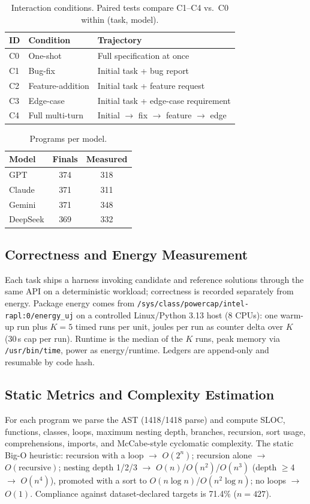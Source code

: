 \documentclass[conference]{IEEEtran}
\begin{document}
\begin{table}[htbp]
\caption{Interaction conditions. Paired tests compare C1--C4 vs.\ C0 within
(task, model).}
\label{tab:conds}
\centering
\begin{tabular}{lll}
\toprule
ID & Condition & Trajectory \\
\midrule
C0 & One-shot & Full specification at once \\
C1 & Bug-fix & Initial task + bug report \\
C2 & Feature-addition & Initial task + feature request \\
C3 & Edge-case & Initial task + edge-case requirement \\
C4 & Full multi-turn & Initial $\rightarrow$ fix $\rightarrow$ feature $\rightarrow$ edge \\
\bottomrule
\end{tabular}
\end{table}

\begin{table}[htbp]
\caption{Programs per model.}
\label{tab:models}
\centering
\begin{tabular}{lcc}
\toprule
Model & Finals & Measured \\
\midrule
GPT & 374 & 318 \\
Claude & 371 & 311 \\
Gemini & 371 & 348 \\
DeepSeek & 369 & 332 \\
\bottomrule
\end{tabular}
\end{table}

\subsection{Correctness and Energy Measurement}
Each task ships a harness invoking candidate and reference solutions through
the same API on a deterministic workload; correctness is recorded separately
from energy. Package energy comes from
\texttt{/sys/class/powercap/intel-rapl:0/energy\_uj} on a
controlled Linux/Python 3.13 host (8 CPUs): one warm-up run plus $K{=}5$
timed runs per unit, joules per run as counter delta over $K$ (30\,s cap per
run). Runtime is the median of the $K$ runs, peak memory via
\texttt{/usr/bin/time}, power as energy/runtime. Ledgers are append-only and
resumable by code hash.

\subsection{Static Metrics and Complexity Estimation}
For each program we parse the AST (1418/1418 parse) and compute
SLOC, functions, classes, loops, maximum nesting depth, branches,
recursion, sort usage, comprehensions, imports, and McCabe-style cyclomatic
complexity. The static Big-O heuristic: recursion with a loop $\rightarrow$ $O(2^n)$;
recursion alone $\rightarrow$ $O(\text{recursive})$; nesting depth 1/2/3
$\rightarrow$ $O(n)$/$O(n^2)$/$O(n^3)$ (depth $\geq$4 $\rightarrow$ $O(n^4)$),
promoted with a sort to $O(n\log n)$/$O(n^2\log n)$; no loops $\rightarrow$
$O(1)$. Compliance against dataset-declared targets is 71.4\% ($n{=}427$).
\end{document}
